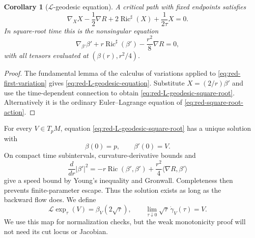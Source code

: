 \documentclass[10pt]{coll-l}
\newtheorem{corollary}[theorem]{Corollary}
\theoremstyle{definition}
\theoremstyle{remark}
\numberwithin{section}{chapter}
\numberwithin{equation}{chapter}
\newcommand{\Ric}{\operatorname{Ric}}
\begin{document}
\begin{corollary}[$\mathcal L$-geodesic equation]
\label{cor:red-L-geodesic-equation}
A critical path with fixed endpoints satisfies
\begin{equation}
 \nabla_X X-\frac12\nabla R+2\Ric^\sharp(X)
       +\frac{1}{2\tau}X=0.                             \label{eq:red-L-geodesic-equation}
\end{equation}
In square-root time this is the nonsingular equation
\begin{equation}
 \nabla_{\beta'}\beta'+r\Ric^\sharp(\beta')
       -\frac{r^2}{8}\nabla R=0,                       \label{eq:red-L-geodesic-square-root}
\end{equation}
with all tensors evaluated at $(\beta(r),r^2/4)$.
\end{corollary}

\begin{proof}
The fundamental lemma of the calculus of variations applied to
\eqref{eq:red-first-variation} gives
\eqref{eq:red-L-geodesic-equation}.  Substitute
$X=(2/r)\beta'$ and use the time-dependent connection to obtain
\eqref{eq:red-L-geodesic-square-root}.  Alternatively it is the ordinary
Euler--Lagrange equation of \eqref{eq:red-square-root-action}.
\end{proof}

For every $V\in T_pM$, equation
\eqref{eq:red-L-geodesic-square-root} has a unique solution with
\begin{equation}
                  \beta(0)=p,
                  \qquad\beta'(0)=V.                   \label{eq:red-L-initial-data}
\end{equation}
On compact time subintervals, curvature-derivative bounds and
\begin{equation}
 \frac d{dr}|\beta'|^2
 =-r\Ric(\beta',\beta')
       +\frac{r^2}{4}\langle\nabla R,\beta'\rangle      \label{eq:red-L-speed-evolution}
\end{equation}
give a speed bound by Young's inequality and Gronwall.  Completeness then
prevents finite-parameter escape.  Thus the solution exists as long as the
backward flow does.  We define
\begin{equation}
             \mathcal L\exp_\tau(V)=\beta_V(2\sqrt\tau),
 \qquad
             \lim_{\tau\downarrow0}\sqrt\tau\,
                    \dot\gamma_V(\tau)=V.               \label{eq:red-L-exponential}
\end{equation}
We use this map for normalization checks, but the weak monotonicity proof
will not need its cut locus or Jacobian.
\end{document}
